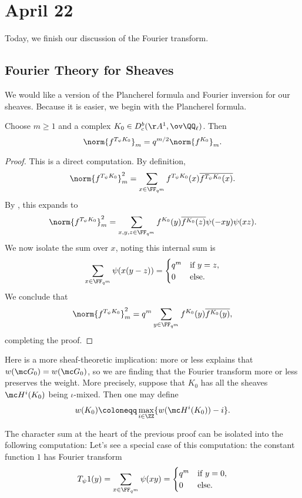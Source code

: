 \documentclass[../notes.tex]{subfiles}
\begin{document}
\section{April 22}
Today, we finish our discussion of the Fourier transform.

\subsection{Fourier Theory for Sheaves}
We would like a version of the Plancherel formula and Fourier inversion for our sheaves. Because it is easier, we begin with the Plancherel formula.
\begin{theorem}[Plancherel] \label{thm:plancherel}
	Choose $m\ge1$ and a complex $K_0\in D^b_c(\AA^1,\ov\QQ_\ell)$. Then
	\[\norm{f^{T_\psi K_0}}_m=q^{m/2}\norm{f^{K_0}}_m.\]
\end{theorem}
\begin{proof}
	This is a direct computation. By definition,
	\[\norm{f^{T_\psi K_0}}_m^2=\sum_{x\in\FF_{q^m}}f^{T_\psi K_0}(x)\overline{f^{T_\psi K_0}(x)}.\]
	By , this expands to
	\[\norm{f^{T_\psi K_0}}_m^2=\sum_{x,y,z\in\FF_{q^m}}f^{K_0}(y)\overline{f^{K_0}(z)}\psi(-xy)\psi(xz).\]
	We now isolate the sum over $x$, noting this internal sum is
	\[\sum_{x\in\FF_{q^m}}\psi(x(y-z))=\begin{cases}
		q^m & \text{if }y=z, \\
		0 & \text{else}.
	\end{cases}\]
	We conclude that
	\[\norm{f^{T_\psi K_0}}_m^2=q^m\sum_{y\in\FF_{q^m}}f^{K_0}(y)\overline{f^{K_0}(y)},\]
	completing the proof.
\end{proof}
\begin{remark}
	Here is a more sheaf-theoretic implication:  more or less explains that $w(\mc G_0)=w(\mc G_0)$, so we are finding that the Fourier transform more or less preserves the weight. More precisely, suppose that $K_0$ has all the sheaves $\mc H^i(K_0)$ being $\iota$-mixed. Then one may define
	\[w(K_0)\coloneqq\max_{i\in\ZZ}\{w(\mc H^i(K_0))-i\}.\]
\end{remark}
The character sum at the heart of the previous proof can be isolated into the following computation: Let's see a special case of this computation: the constant function $1$ has Fourier transform
\[T_\psi1(y)=\sum_{x\in\FF_{q^m}}\psi(xy)=\begin{cases}
	q^m & \text{if }y=0, \\
	0 & \text{else}.
\end{cases}\]
\end{document}
